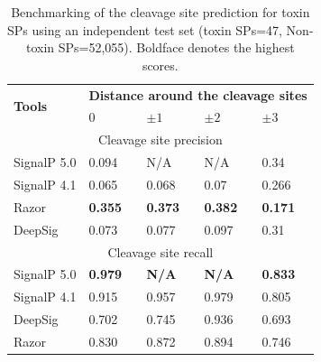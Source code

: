 \begin{table}[]
\centering
\caption[Benchmarking of the cleavage site prediction for toxin SPs using an independent test set (toxin SPs=47, Non-toxin SPs=52,055).]{Benchmarking of the cleavage site prediction for toxin SPs using an independent test set (toxin SPs=47, Non-toxin SPs=52,055). Boldface denotes the highest scores.
}
\begin{tabular}{|l|l|l|l|l|}
\hline
\multirow{2}{*}{\textbf{Tools}} & \multicolumn{4}{l|}{\textbf{Distance around the cleavage sites}} \\ \cline{2-5} 
            & 0              & $\pm1$              & $\pm2$              & $\pm3$      \\ \hline
\multicolumn{5}{|c|}{Cleavage site precision}                                   \\ \hline
SignalP 5.0 & 0.094          & N/A            & N/A            & 0.34           \\ \hline
SignalP 4.1 & 0.065          & 0.068          & 0.07           & 0.266          \\ \hline
Razor       & \textbf{0.355} & \textbf{0.373} & \textbf{0.382} & \textbf{0.171} \\ \hline
DeepSig     & 0.073          & 0.077          & 0.097          & 0.31           \\ \hline
\multicolumn{5}{|c|}{Cleavage site recall}                                      \\ \hline
SignalP 5.0 & \textbf{0.979} & \textbf{N/A}   & \textbf{N/A}   & \textbf{0.833} \\ \hline
SignalP 4.1 & 0.915          & 0.957          & 0.979          & 0.805          \\ \hline
DeepSig     & 0.702          & 0.745          & 0.936          & 0.693          \\ \hline
Razor       & 0.830          & 0.872          & 0.894          & 0.746          \\ \hline
\end{tabular}

\label{tab:razor_benchmark_independent_test_set_toxin_precision_recall}
\end{table}